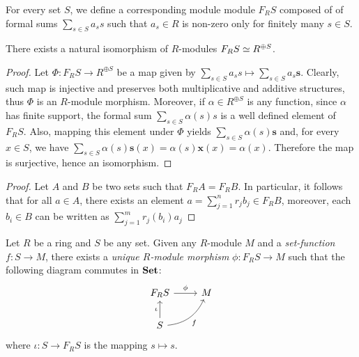 For every set \(S\), we define a corresponding module module \(F_R S\) composed
of of formal sums \(\sum_{s \in S} a_s s\) such that \(a_s \in R\) is non-zero
only for finitely many \(s \in S\).

\begin{proposition}
\label{prop:free-module-structure-isomorphism}
There exists a natural isomorphism of \(R\)-modules \(F_R S \simeq R^{\oplus S}\).
\end{proposition}

\begin{proof}
Let \(\Phi: F_R S \to R^{\oplus S}\) be a map given by
\(\sum_{s \in S} a_s s \mapsto \sum_{s \in S} a_s \mathbf{s}\). Clearly, such
map is injective and preserves both multiplicative and additive structures, thus
\(\Phi\) is an \(R\)-module morphism. Moreover, if \(\alpha \in R^{\oplus S}\)
is any function, since \(\alpha\) has finite support, the formal sum
\(\sum_{s \in S} \alpha(s) s\) is a well defined element of \(F_R S\). Also,
mapping this element under \(\Phi\) yields
\(\sum_{s \in S} \alpha(s) \mathbf{s}\) and, for every \(x \in S\), we have
\(\sum_{s \in S} \alpha(s) \mathbf{s}(x) = \alpha(s) \mathbf{x}(x) =
\alpha(x)\). Therefore the map is surjective, hence an isomorphism.
\end{proof}

\begin{proof}
Let \(A\) and \(B\) be two sets such that \(F_R A = F_R B\). In particular, it
follows that for all \(a \in A\), there exists an element \(a = \sum_{j=1}^n r_j
b_j \in F_R B\), moreover, each \(b_i \in B\) can be written as \(\sum_{j=1}^m
r_j(b_i) a_j\)
\end{proof}

\begin{proposition}
\label{prop:free-mod-univ-prop}
Let \(R\) be a ring and \(S\) be any set. Given any \(R\)-module \(M\) and a
\emph{set-function} \(f: S \to M\), there exists a \emph{unique \(R\)-module
  morphism} \(\phi: F_R S \to M\) such that the following diagram commutes in
\({\textbf{Set}}\):
\[
\begin{tikzcd}
F_R S \ar[r, "\phi"] &M \\
S \ar[u, "\iota"] \ar[ru, "f"', bend right] &
\end{tikzcd}
\]
where \(\iota: S \to F_R S\) is the mapping \(s \mapsto s\).
\end{proposition}

